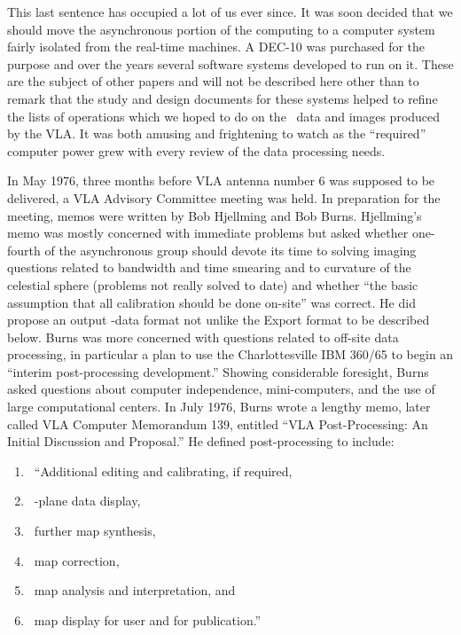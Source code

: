 This last sentence has occupied a lot of us ever since.  It was soon
decided that we should move the asynchronous portion of the computing
to a computer system fairly isolated from the real-time machines.  A
DEC-10 was purchased for the purpose and over the years several
software systems developed to run on it.  These are the subject of
other papers and will not be described here other than to remark that
the study and design documents for these systems helped to refine the
lists of operations which we hoped to do on the \uv\ data and images
produced by the \hbox{VLA}.  It was both amusing and frightening to
watch as the ``required'' computer power grew with every review of the
data processing needs.

In May 1976, three months before VLA antenna number 6 was supposed to
be delivered, a VLA Advisory Committee meeting was held.  In
preparation for the meeting, memos were written by Bob Hjellming and
Bob Burns.  Hjellming's memo was mostly concerned with immediate
problems but asked whether one-fourth of the asynchronous group should
devote its time to solving imaging questions related to bandwidth and
time smearing and to curvature of the celestial sphere (problems not
really solved to date) and whether ``the basic assumption that all
calibration should be done on-site'' was correct.  He did propose an
output \uv-data format not unlike the Export format to be described
below.  Burns was more concerned with questions related to off-site
data processing, in particular a plan to use the Charlottesville IBM
360/65 to begin an ``interim post-processing development.''  Showing
considerable foresight, Burns asked questions about computer
independence, mini-computers, and the use of large computational
centers.  In July 1976, Burns wrote a lengthy memo, later called VLA
Computer Memorandum 139, entitled ``VLA Post-Processing: An Initial
Discussion and Proposal.''  He defined post-processing to
include:\vspace{-4pt}
\begin{enumerate}
  \item\ ``Additional editing and calibrating, if required,\vspace{-6pt}
  \item\ \uv-plane data display,\vspace{-6pt}
  \item\ further map synthesis,\vspace{-6pt}
  \item\ map correction,\vspace{-6pt}
  \item\ map analysis and interpretation, and\vspace{-6pt}
  \item\ map display for user and for publication.''\vspace{-6pt}
\end{enumerate}
